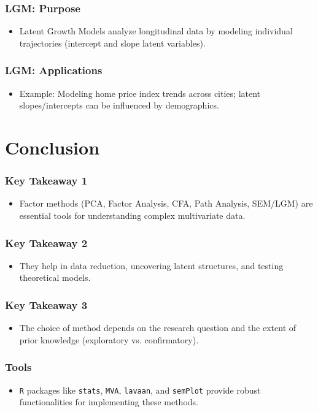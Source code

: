 \documentclass{beamer}
\newcommand{\code}[1]{\texttt{#1}}
\begin{document}
\begin{frame}
    \frametitle{LGM: Purpose}
    \begin{itemize}
        \item Latent Growth Models analyze longitudinal data by modeling individual trajectories (intercept and slope latent variables).
    \end{itemize}
\end{frame}

\begin{frame}
    \frametitle{LGM: Applications}
    \begin{itemize}
        \item Example: Modeling home price index trends across cities; latent slopes/intercepts can be influenced by demographics.
    \end{itemize}
\end{frame}

\section{Conclusion}

\begin{frame}
    \frametitle{Key Takeaway 1}
    \begin{itemize}
        \item Factor methods (PCA, Factor Analysis, CFA, Path Analysis, SEM/LGM) are essential tools for understanding complex multivariate data.
    \end{itemize}
\end{frame}

\begin{frame}
    \frametitle{Key Takeaway 2}
    \begin{itemize}
        \item They help in \alert{data reduction}, uncovering \alert{latent structures}, and \alert{testing theoretical models}.
    \end{itemize}
\end{frame}

\begin{frame}
    \frametitle{Key Takeaway 3}
    \begin{itemize}
        \item The choice of method depends on the research question and the extent of prior knowledge (exploratory vs. confirmatory).
    \end{itemize}
\end{frame}

\begin{frame}
    \frametitle{Tools}
    \begin{itemize}
        \item \code{R} packages like \code{stats}, \code{MVA}, \code{lavaan}, and \code{semPlot} provide robust functionalities for implementing these methods.
    \end{itemize}
\end{frame}
\end{document}
